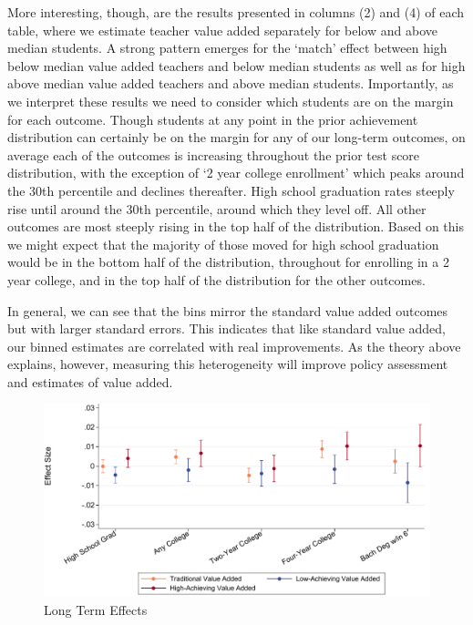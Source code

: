 \documentclass{article}
\theoremstyle{definition}
\theoremstyle{definition}
\theoremstyle{definition}
\theoremstyle{definition}
\begin{document}
More interesting, though, are the results presented in columns (2) and (4) of each table, where we estimate teacher value added separately for below and above median students. A strong pattern emerges for the `match' effect between high below median value added teachers and below median students as well as for high above median value added teachers and above median students. Importantly, as we interpret these results we need to consider which students are on the margin for each outcome. Though students at any point in the prior achievement distribution can certainly be on the margin for any of our long-term outcomes, on average each of the outcomes is increasing throughout the prior test score distribution, with the exception of `2 year college enrollment' which peaks around the 30th percentile and declines thereafter. High school graduation rates steeply rise until around the 30th percentile, around which they level off. All other outcomes are most steeply rising in the top half of the distribution. Based on this we might expect that the majority of those moved for high school graduation would be in the bottom half of the distribution, throughout for enrolling in a 2 year college, and in the top half of the distribution for the other outcomes.

In general, we can see that the bins mirror the standard value added outcomes but with larger standard errors. This indicates that like standard value added, our binned estimates are correlated with real improvements. As the theory above explains, however, measuring this heterogeneity will improve policy assessment and estimates of value added. 

\begin{figure}[H]
\begin{center}

\includegraphics[width=.9\textwidth]{Working_Paper/WP_Figures/fig2b_longterm.pdf}
\end{center}
    \caption{Long Term Effects}
    \label{fig_long_term}
\end{figure}
\end{document}

